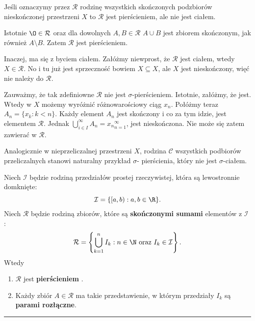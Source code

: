 \begin{eg}
	Jeśli oznaczymy przez $\mathcal{R}$ rodzinę wszystkich skończonych podzbiorów nieskończonej przestrzeni $X$ to $\mathcal{R}$ jest pierścieniem, ale nie jest ciałem.

	Istotnie $\O \in \mathcal{R}$ oraz dla dowolnych $A,B \in \mathcal{R}$ $A\cup B$ jest zbiorem skończonym, jak również $A\setminus B$. Zatem $\mathcal{R}$ jest pierścieniem. 
	
	Inaczej, ma się z byciem ciałem. Załóżmy niewprost, że $\mathcal{R}$ jest ciałem, wtedy $X\in \mathcal{R}$. No i tu już jest sprzeczność bowiem $X\subseteq X$, ale $X$ jest nieskończony, więć nie należy do $\mathcal{R}$.

	Zauważmy, że tak zdefiniowne $\mathcal{R}$ nie jest $\sigma$-pierścieniem. Istotnie, załóżmy, że jest. Wtedy w  $X$ możemy wyróżnić różnowarościowy ciąg $x_{n}$. Połóżmy teraz $A_{n}= \{x_{k}: k<n\} $. Każdy element $A_{n}$ jest skończony i co za tym idzie, jest elementem $\mathcal{R}$.
	Jednak $\bigcup_{i \in  I}^{\infty} A_{n} = {x_{n}}_{n=1}^{\infty}$, jest nieskończona. Nie może się zatem zawierać w $\mathcal{R}$.
	
	Analogicznie w nieprzeliczalnej przestrzeni $X$, rodzina $\mathcal{C}$ wszystkich podbiorów przeliczalnych stanowi naturalny przykład $\sigma$- pierścienia, który nie jest $\sigma$-ciałem.
\end{eg} 
\begin{theorem}
	Niech $\mathcal{I}$ będzie rodziną przedziałów prostej rzeczywistej, która są lewostronnie domknięte:
	\[
	\mathcal{I} = \{[a,b): a,b\in \R\} 
	.\] 
	Niech $\mathcal{R}$ będzie rodziną zbiorów, które są \textbf{skończonymi sumami} elementów z $\mathcal{I}$ :  
	\[
	\mathcal{R} = \left\{\bigcup_{k=1}^{n}I_{k}: n\in \N \text{ oraz }I_{k}\in \mathcal{I}\right\} 
	.\] 
	Wtedy 
	\begin{enumerate}[label=\arabic*.]
		\item $\mathcal{R}$  jest \textbf{pierścieniem} .
		\item Każdy zbiór $A\in \mathcal{R}$ ma takie przedstawienie, w którym przedziały $I_{k}$ są \textbf{parami rozłączne}. 
	\end{enumerate}
\end{theorem}
\vspace{1em}

\hrule

\vspace{1em}

